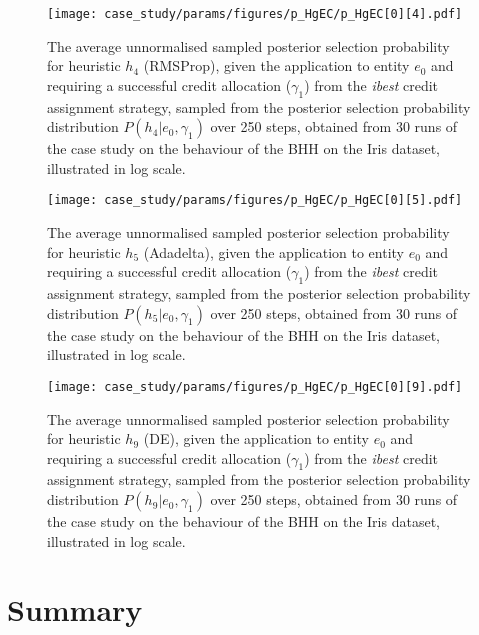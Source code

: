 \begin{figure}[htpb]
	\centering
	\texttt{[image: case\_study/params/figures/p\_HgEC/p\_HgEC[0][4].pdf]}
	\caption{The average unnormalised sampled posterior selection probability for heuristic $h_{4}$ (\acs{RMSProp}), given the application to entity $e_{0}$ and requiring a successful credit allocation ($\gamma_{1}$) from the \textit{ibest} credit assignment strategy, sampled from the posterior selection probability distribution $P(h_{4} \vert e_{0}, \gamma_{1})$ over 250 steps, obtained from 30 runs of the case study on the behaviour of the \acs{BHH} on the Iris dataset, illustrated in log scale.}
	\label{fig:app:case_study_additional:p_HgEC:0:4}
\end{figure}

\begin{figure}[htpb]
	\centering
	\texttt{[image: case\_study/params/figures/p\_HgEC/p\_HgEC[0][5].pdf]}
	\caption{The average unnormalised sampled posterior selection probability for heuristic $h_{5}$ (\acs{Adadelta}), given the application to entity $e_{0}$ and requiring a successful credit allocation ($\gamma_{1}$) from the \textit{ibest} credit assignment strategy, sampled from the posterior selection probability distribution $P(h_{5} \vert e_{0}, \gamma_{1})$ over 250 steps, obtained from 30 runs of the case study on the behaviour of the \acs{BHH} on the Iris dataset, illustrated in log scale.}
	\label{fig:app:case_study_additional:p_HgEC:0:5}
\end{figure}

\begin{figure}[htpb]
	\centering
	\texttt{[image: case\_study/params/figures/p\_HgEC/p\_HgEC[0][9].pdf]}
	\caption{The average unnormalised sampled posterior selection probability for heuristic $h_{9}$ (\acs{DE}), given the application to entity $e_{0}$ and requiring a successful credit allocation ($\gamma_{1}$) from the \textit{ibest} credit assignment strategy, sampled from the posterior selection probability distribution $P(h_{9} \vert e_{0}, \gamma_{1})$ over 250 steps, obtained from 30 runs of the case study on the behaviour of the \acs{BHH} on the Iris dataset, illustrated in log scale.}
	\label{fig:app:case_study_additional:p_HgEC:0:9}
\end{figure}

\section{Summary}
\label{app:case_study_additional:summary}